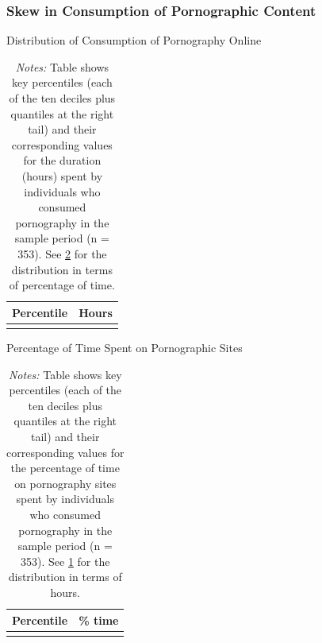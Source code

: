 \documentclass[12pt, letterpaper]{article}
\begin{document}
\FloatBarrier
\subsubsection{Skew in Consumption of Pornographic Content}
\begin{table}[ht] \centering \small \setlength\tabcolsep{10 pt}
	\caption{Distribution of Consumption of Pornography Online}
	\label{tab:distribution_duration}
	\begin{adjustbox}{max width=\textwidth}
		\begin{tabular}{cr}
			\toprule
			\multicolumn{1}{c}{\textbf{Percentile}}&\multicolumn{1}{c}{\textbf{Hours}}\\
			\midrule
			\\
			\bottomrule
		\end{tabular}
	\end{adjustbox}
	\caption*{\footnotesize \emph{Notes:} 
		Table shows key percentiles (each of the ten deciles plus quantiles at the right tail) and their corresponding values for the duration (hours) spent by individuals who consumed pornography in the sample period (n = 353). 
		See \cref{tab:distribution_prop_duration} for the distribution in terms of percentage of time.
	}
\end{table}

\begin{table}[ht] \centering \small \setlength\tabcolsep{10 pt}
	\caption{Percentage of Time Spent on Pornographic Sites}
	\label{tab:distribution_prop_duration}
	\begin{adjustbox}{max width=\textwidth}
		\begin{tabular}{cr}
			\toprule
			\multicolumn{1}{c}{\textbf{Percentile}}&\multicolumn{1}{c}{\textbf{\% time}}\\
			\midrule
			\\
			\bottomrule
		\end{tabular}
	\end{adjustbox}
	\caption*{\footnotesize \emph{Notes:} 
		Table shows key percentiles (each of the ten deciles plus quantiles at the right tail) and their corresponding values for the percentage of time on pornography sites spent by individuals who consumed pornography in the sample period (n = 353). 
		See \cref{tab:distribution_duration} for the distribution in terms of hours.
	}
\end{table}
\end{document}
